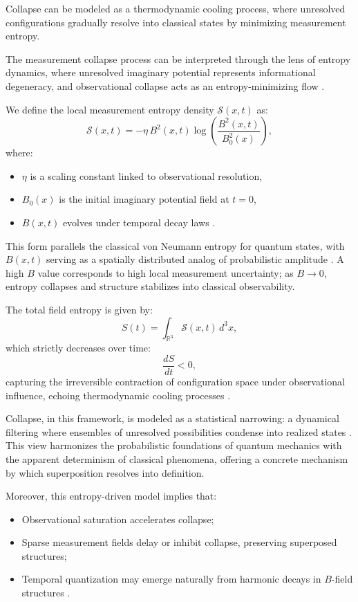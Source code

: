 Collapse can be modeled as a thermodynamic cooling process, where unresolved configurations gradually resolve into classical states by minimizing measurement entropy.

The measurement collapse process can be interpreted through the lens of entropy dynamics, where unresolved imaginary potential represents informational degeneracy, and observational collapse acts as an entropy-minimizing flow \cite{zurek_decoherence, gisin_epistemology_2014}.

We define the local measurement entropy density $\mathcal{S}(x,t)$ as:
\[
\mathcal{S}(x,t) = -\eta \, B^2(x,t) \log\left( \frac{B^2(x,t)}{B_0^2(x)} \right),
\]
where:
\begin{itemize}
    \item $\eta$ is a scaling constant linked to observational resolution,
    \item $B_0(x)$ is the initial imaginary potential field at $t=0$,
    \item $B(x,t)$ evolves under temporal decay laws \cite{bassi_models_2013}.
\end{itemize}

This form parallels the classical von Neumann entropy for quantum states, with $B(x,t)$ serving as a spatially distributed analog of probabilistic amplitude \cite{zurek_decoherence, bassi_models_2013}. A high $B$ value corresponds to high local measurement uncertainty; as $B \rightarrow 0$, entropy collapses and structure stabilizes into classical observability.

The total field entropy is given by:
\[
S(t) = \int_{\mathbb{R}^3} \mathcal{S}(x,t) \, d^3x,
\]
which strictly decreases over time:
\[
\frac{dS}{dt} < 0,
\]
capturing the irreversible contraction of configuration space under observational influence, echoing thermodynamic cooling processes \cite{adler_conservation_2002, tumulka_epistemology_2007}.

Collapse, in this framework, is modeled as a statistical narrowing: a dynamical filtering where ensembles of unresolved possibilities condense into realized states \cite{bassi_models_2013, penrose_gravity_1996}. This view harmonizes the probabilistic foundations of quantum mechanics with the apparent determinism of classical phenomena, offering a concrete mechanism by which superposition resolves into definition.

Moreover, this entropy-driven model implies that:
\begin{itemize}
    \item Observational saturation accelerates collapse;
    \item Sparse measurement fields delay or inhibit collapse, preserving superposed structures;
    \item Temporal quantization may emerge naturally from harmonic decays in $B$-field structures \cite{penrose_diosi_model, donadi_nonmarkovian_2021}.
\end{itemize}

